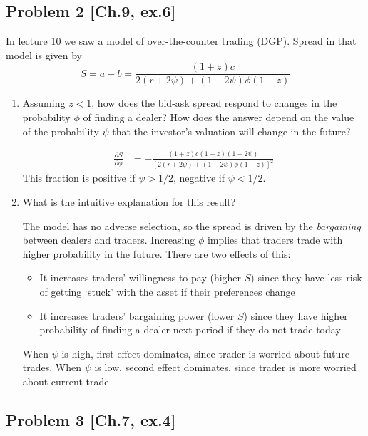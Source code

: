 \documentclass[11pt
, answers
]{exam}
\begin{document}
\quad
\subsection*{Problem 2 [Ch.9, ex.6]}

In lecture 10 we saw a model of over-the-counter trading (DGP). Spread in that model is given by
\[
S=a-b=\frac{(1+z)c}{2(r+2\psi)+(1-2\psi)\phi(1-z)}
\]
\begin{enumerate}[label=(\alph*). ]
	\item Assuming $z<1$, how does the bid-ask spread respond to changes in the probability $\phi$ of finding a dealer? How does the answer depend on the value of the probability $\psi$ that the investor's valuation will change in the future?
	
	\begin{solution}
		\begin{align*}
			\frac{\partial S}{\partial \phi} & = -\frac{(1+z)c(1-z)(1-2\psi)}{[2(r+2\psi)+(1-2\psi)\phi(1-z)]^2}
		\end{align*}
		This fraction is positive if $\psi>1/2$, negative if $\psi<1/2$.
	\end{solution}
	
	
	\item What is the intuitive explanation for this result?
	
	\begin{solution}
		 The model has no adverse selection, so the spread is driven by the \textit{bargaining} between dealers and traders. Increasing $\phi$ implies that traders trade with higher probability in the future. There are two effects of this:
		\begin{itemize}
			\item It increases traders' willingness to pay (higher $S$) since they have less risk of getting `stuck' with the asset if their preferences change
			\item It increases traders' bargaining power (lower $S$) since they have higher probability of finding a dealer next period if they do not trade today
		\end{itemize}
		When $\psi$ is high, first effect dominates, since trader is worried about future trades. When $\psi$ is low, second effect dominates, since trader is more worried about current trade
	\end{solution}
\end{enumerate}



\quad
\subsection*{Problem 3 [Ch.7, ex.4]}
\end{document}
